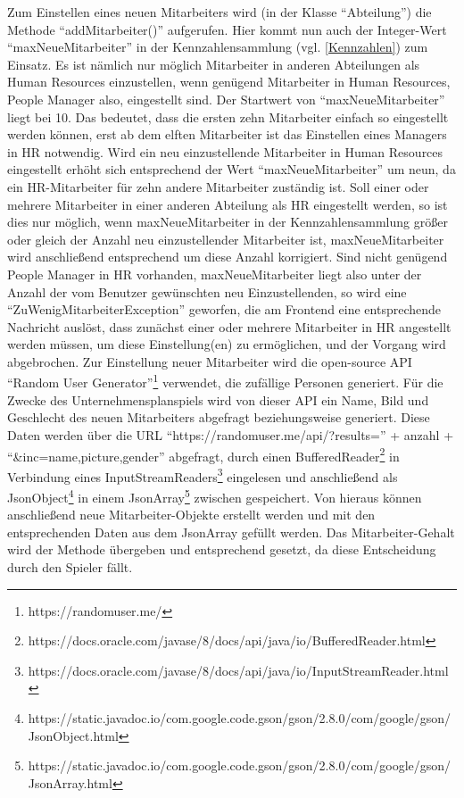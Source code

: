 Zum Einstellen eines neuen Mitarbeiters wird (in der Klasse \enquote{Abteilung}) die Methode \enquote{addMitarbeiter()} aufgerufen. Hier kommt nun auch der Integer-Wert \enquote{maxNeueMitarbeiter} in der Kennzahlensammlung (vgl. \ref{Kennzahlen}) zum Einsatz. Es ist nämlich nur möglich Mitarbeiter in anderen Abteilungen als Human Resources einzustellen, wenn genügend Mitarbeiter in Human Resources, People Manager also, eingestellt sind. Der Startwert von \enquote{maxNeueMitarbeiter} liegt bei 10. Das bedeutet, dass die ersten zehn Mitarbeiter einfach so eingestellt werden können, erst ab dem elften Mitarbeiter ist das Einstellen eines Managers in HR notwendig. Wird ein neu einzustellende Mitarbeiter in Human Resources eingestellt erhöht sich entsprechend der Wert \enquote{maxNeueMitarbeiter} um neun, da ein HR-Mitarbeiter für zehn andere Mitarbeiter zuständig ist. Soll einer oder mehrere Mitarbeiter in einer anderen Abteilung als HR eingestellt werden, so ist dies nur möglich, wenn maxNeueMitarbeiter in der Kennzahlensammlung größer oder gleich der Anzahl neu einzustellender Mitarbeiter ist, maxNeueMitarbeiter wird anschließend entsprechend um diese Anzahl korrigiert. Sind nicht genügend People Manager in HR vorhanden, maxNeueMitarbeiter liegt also unter der Anzahl der vom Benutzer gewünschten neu Einzustellenden, so wird eine \enquote{ZuWenigMitarbeiterException} geworfen, die am Frontend eine entsprechende Nachricht auslöst, dass zunächst einer oder mehrere Mitarbeiter in HR angestellt werden müssen, um diese Einstellung(en) zu ermöglichen, und der Vorgang wird abgebrochen. Zur Einstellung neuer Mitarbeiter wird die open-source API \enquote{Random User Generator}\footnote{https://randomuser.me/} verwendet, die zufällige Personen generiert. Für die Zwecke des Unternehmensplanspiels wird von dieser API ein Name, Bild und Geschlecht des neuen Mitarbeiters abgefragt beziehungsweise generiert. Diese Daten werden über die URL \enquote{https://randomuser.me/api/?results=} + anzahl + \enquote{\&inc=name,picture,gender} abgefragt, durch einen BufferedReader\footnote{https://docs.oracle.com/javase/8/docs/api/java/io/BufferedReader.html} in Verbindung eines InputStreamReaders\footnote{https://docs.oracle.com/javase/8/docs/api/java/io/InputStreamReader.html} eingelesen und anschließend als JsonObject\footnote{https://static.javadoc.io/com.google.code.gson/gson/2.8.0/com/google/gson/JsonObject.html} in einem JsonArray\footnote{https://static.javadoc.io/com.google.code.gson/gson/2.8.0/com/google/gson/JsonArray.html} zwischen gespeichert. Von hieraus können anschließend neue Mitarbeiter-Objekte erstellt werden und mit den entsprechenden Daten aus dem JsonArray gefüllt werden. Das Mitarbeiter-Gehalt wird der Methode übergeben und entsprechend gesetzt, da diese Entscheidung durch den Spieler fällt.

